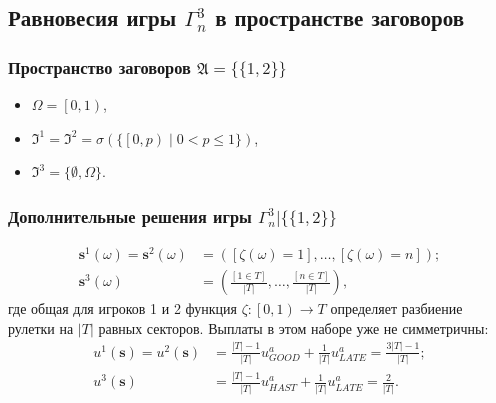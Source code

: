
\subsection{Равновесия игры $\Gamma^3_n$ в пространстве заговоров}

\begin{frame}
	\frametitle{Пространство заговоров $\mathfrak{A} = \{\{1,2\}\}$}
	\begin{itemize}
		\item $\Omega = \left[0, 1\right)$,
		\item $\mathfrak{I}^1 = \mathfrak{I}^2 = \sigma(\{\left[ 0, p \right) \mid 0 < p \leq 1 \})$,
		\item $\mathfrak{I}^3 = \{\emptyset, \Omega\}$.
	\end{itemize}
\end{frame}

\begin{frame}
	\frametitle{Дополнительные решения игры $\Gamma^3_n | \{\{1,2\}\}$}
	\begin{align*}
		\mathbf{s}^1(\omega) = \mathbf{s}^2(\omega) &= ([\zeta(\omega) = 1], \ldots, [\zeta(\omega) = n]); \\ \mathbf{s}^3(\omega) &= \left(\frac{[1 \in T]}{\left| T \right|}, \ldots, \frac{[n \in T]}{\left| T \right|}\right),
	\end{align*}
	где общая для игроков 1 и 2 функция $\zeta : \left[0, 1\right) \rightarrow T$ определяет разбиение рулетки на $\left| T \right|$ равных секторов. Выплаты в этом наборе уже не симметричны:
	\begin{align*}
		u^1(\mathbf{s}) = u^2(\mathbf{s}) &= \frac{\left| T \right| - 1}{\left| T \right|} u^a_{GOOD} + \frac{1}{\left| T \right|} u^a_{LATE} = \frac{3 \left| T \right| - 1}{\left| T \right|};\\
		u^3(\mathbf{s}) &= \frac{\left| T \right| - 1}{\left| T \right|} u^a_{HAST} + \frac{1}{\left| T \right|} u^a_{LATE} = \frac{2}{\left| T \right|}.
	\end{align*}
\end{frame}


